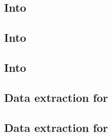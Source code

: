 \subsection{Into \userTxnDataMod{}                \lispTodo{}}        \label{rlp auth: lookup: into txn data}              
\subsection{Into \btcMod{}                        \lispTodo{}}        \label{rlp auth: lookup: into block data}            
\subsection{Into \hubMod{}                        \lispTodo{}}        \label{rlp auth: lookup: into hub}                   
\subsection{Data extraction for      \lispTodo{}}        \label{rlp auth: lookup: extraction for code hash}   
\subsection{Data extraction for \macroEcrecover{} \lispTodo{}}        \label{rlp auth: lookup: extraction for ecrecover}   
